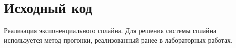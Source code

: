 \section{Исходный код}

Реализация экспоненциального сплайна. Для решения системы сплайна используется метод прогонки, реализованный ранее в лабораторных работах.



\pagebreak
